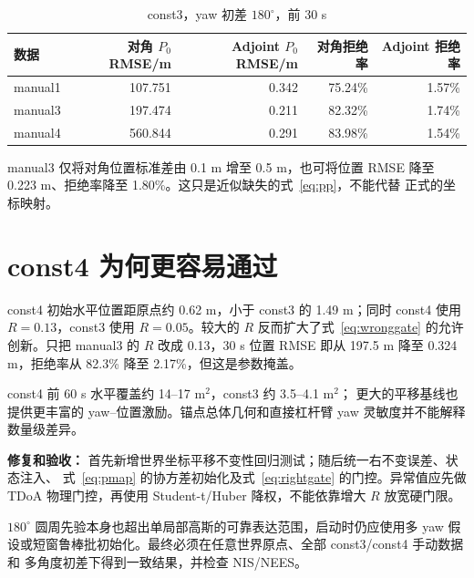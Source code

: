 \documentclass[10pt,a4paper]{ctexart}
\begin{document}
\begin{table}[htbp]
\centering
\caption{const3，yaw 初差 $180^\circ$，前 30 s}
\begin{tabular}{lrrrr}
\toprule
数据 & 对角 $P_0$ RMSE/m & Adjoint $P_0$ RMSE/m &
对角拒绝率 & Adjoint 拒绝率\\
\midrule
manual1 & 107.751 & 0.342 & 75.24\% & 1.57\%\\
manual3 & 197.474 & 0.211 & 82.32\% & 1.74\%\\
manual4 & 560.844 & 0.291 & 83.98\% & 1.54\%\\
\bottomrule
\end{tabular}
\end{table}

manual3 仅将对角位置标准差由 0.1 m 增至 0.5 m，也可将位置 RMSE 降至
0.223 m、拒绝率降至 1.80\%。这只是近似缺失的式~\eqref{eq:pp}，不能代替
正式的坐标映射。

\section{const4 为何更容易通过}

const4 初始水平位置距原点约 0.62 m，小于 const3 的 1.49 m；同时 const4 使用
$R=0.13$，const3 使用 $R=0.05$。较大的 $R$ 反而扩大了式~\eqref{eq:wronggate}
的允许创新。只把 manual3 的 $R$ 改成 0.13，30 s 位置 RMSE 即从 197.5 m
降至 0.324 m，拒绝率从 82.3\% 降至 2.17\%，但这是参数掩盖。

const4 前 60 s 水平覆盖约 14--17 m$^2$，const3 约 3.5--4.1 m$^2$；
更大的平移基线也提供更丰富的 yaw--位置激励。锚点总体几何和直接杠杆臂 yaw
灵敏度并不能解释数量级差异。

\noindent\textbf{修复和验收：}
首先新增世界坐标平移不变性回归测试；随后统一右不变误差、状态注入、
式~\eqref{eq:pmap} 的协方差初始化及式~\eqref{eq:rightgate} 的门控。异常值应先做
TDoA 物理门控，再使用 Student-t/Huber 降权，不能依靠增大 $R$ 放宽硬门限。

$180^\circ$ 圆周先验本身也超出单局部高斯的可靠表达范围，启动时仍应使用多 yaw
假设或短窗鲁棒批初始化。最终必须在任意世界原点、全部 const3/const4 手动数据和
多角度初差下得到一致结果，并检查 NIS/NEES。
\end{document}
